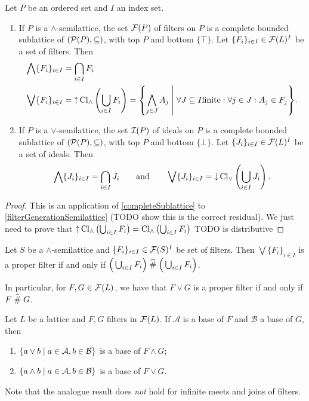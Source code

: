 \begin{proposition} \label{latticeFiltersIdeals}
Let $P$ be an ordered set and $I$ an index set.
\begin{enumerate}
\item If $P$ is a $\wedge$-semilattice, the set $\operatorname{\mathcal{F}}(P)$ of filters on $P$ is a complete bounded sublattice of $\sSet{\powerset(P), \subseteq}$, with top $P$ and bottom $\{\top\}$. Let $\{F_i\}_{i\in I} \in \operatorname{\mathcal{F}}(L)^I$ be a set of filters. Then
\begin{align*}
\bigwedge \{F_i\}_{i\in I} &= \bigcap_{i\in I}F_i \\
\bigvee \{F_i\}_{i\in I} &= \upset \Closure_\wedge\left(\bigcup_{i\in I}F_i\right) = \setbuilder{\bigwedge_{j\in J}A_j}{\forall J\subseteq I \text{finite}: \forall j\in J: A_j\in F_j}.
\end{align*}
\item If $P$ is a $\vee$-semilattice, the set $\operatorname{\mathcal{I}}(P)$ of ideals on $P$ is a complete bounded sublattice of $\sSet{\powerset(P), \subseteq}$, with top $P$ and bottom $\{\bot\}$. Let $\{J_i\}_{i\in I} \in \operatorname{\mathcal{F}}(L)^I$ be a set of ideals. Then
\[ \bigwedge \{J_i\}_{i\in I} = \bigcap_{i\in I}J_i \qquad\text{and}\qquad
\bigvee \{J_i\}_{i\in I} = \operatorname{\downarrow} \operatorname{Cl}_\vee\left(\bigcup_{i\in I}J_i\right). \]
\end{enumerate}
\end{proposition}
\begin{proof}
This is an application of \ref{completeSublattice} to \ref{filterGenerationSemilattice} (TODO show this is the correct residual). We just need to prove that $\operatorname{\uparrow}\operatorname{Cl}_\wedge \left(\bigcup_{i\in I}F_i\right) = \operatorname{Cl}_\wedge \left(\bigcup_{i\in I}F_i\right)$ TODO is distributive
\end{proof}
\begin{corollary} \label{joinProperFilter}
Let $S$ be a $\wedge$-semilattice and $\{F_i\}_{i\in I} \in \operatorname{\mathcal{F}}(S)^I$ be set of filters. Then $\bigvee \{F_i\}_{i\in I}$ is a proper filter \textup{if and only if} $\Big(\bigcup_{i\in I}F_i\Big)\mathrel{\widehat{\#}} \Big(\bigcup_{i\in I}F_i\Big)$.
\end{corollary}
In particular, for $F, G\in\operatorname{\mathcal{F}}(L)$, we have that $F\vee G$ is a proper filter if and only if $F\mathrel{\widehat{\#}} G$.

\begin{lemma} \label{baseMeetJoinFilters}
Let $L$ be a lattice and $F,G$ filters in $\operatorname{\mathcal{F}}(L)$. If $\mathcal{A}$ is a base of $F$ and $\mathcal{B}$ a base of $G$, then
\begin{enumerate}
\item $\setbuilder{a\vee b}{a\in \mathcal{A}, b\in \mathcal{B}}$ is a base of $F\wedge G$;
\item $\setbuilder{a\wedge b}{a\in \mathcal{A}, b\in \mathcal{B}}$ is a base of $F\vee G$.
\end{enumerate}
\end{lemma}
Note that the analogue result does \emph{not} hold for infinite meets and joins of filters.



